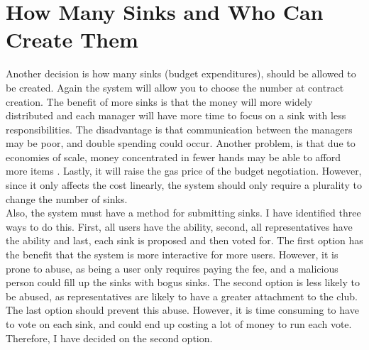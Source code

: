 \section{How Many Sinks and Who Can Create Them}
Another decision is how many sinks (budget expenditures), should be allowed to be created. Again the system will allow you to choose the number at contract creation. The benefit of more sinks is that the money will more widely distributed and each manager will have more time to focus on a sink with less responsibilities. The disadvantage is that communication between the managers may be poor, and double spending could occur. Another problem, is that due to economies of scale, money concentrated in fewer hands may be able to afford more items . Lastly, it will raise the gas price of the budget negotiation. However, since it only affects the cost linearly, the system should only require a plurality to change the number of sinks.
\\
Also, the system must have a method for submitting sinks. I have identified three ways to do this. First, all users have the ability, second, all representatives have the ability and last, each sink is proposed and then voted for. The first option has the benefit that the system is more interactive for more users. However, it is prone to abuse, as being a user only requires paying the fee, and a malicious person could fill up the sinks with bogus sinks.  The second option is less likely to be abused, as representatives are likely to have a greater attachment to the club. The last option should prevent this abuse. However, it is time consuming to have to vote on each sink, and could end up costing a lot of money to run each vote. Therefore, I have decided on the second option.
